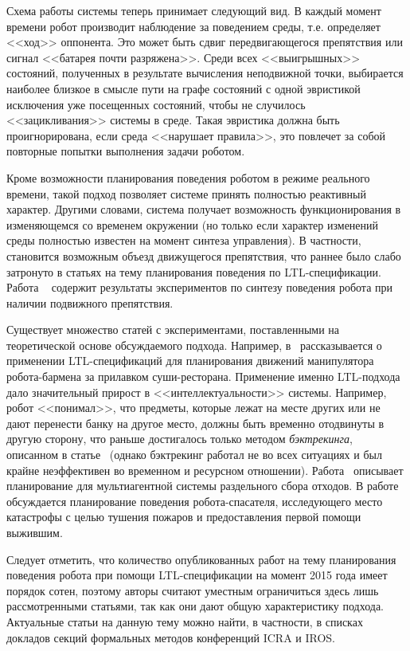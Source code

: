 \documentclass[a4, 14pt]{article}
\begin{document}
Схема работы системы теперь принимает следующий вид. В каждый момент времени 
робот производит наблюдение за поведением среды, т.е. определяет <<ход>> 
оппонента. Это может быть сдвиг передвигающегося препятствия или сигнал <<батарея 
почти разряжена>>. Среди всех <<выигрышных>> состояний, полученных в результате 
вычисления неподвижной точки, выбирается наиболее близкое в смысле пути на графе 
состояний с одной эвристикой исключения уже посещенных состояний, чтобы не 
случилось <<зацикливания>> системы в среде. Такая эвристика должна быть 
проигнорирована, если среда <<нарушает правила>>, это повлечет за собой повторные 
попытки выполнения задачи роботом.

Кроме возможности планирования поведения роботом в режиме реального времени, 
такой подход позволяет системе принять полностью реактивный характер. 
Другими словами, система получает возможность функционирования в изменяющемся со временем окружении 
(но только если характер изменений среды полностью известен на момент синтеза управления).
В частности, становится возможным объезд движущегося препятствия, что раннее было 
слабо затронуто в статьях на тему планирования поведения по LTL-спецификации. 
Работа ~\cite{piterman2006synthesis} содержит результаты экспериментов по 
синтезу поведения робота при наличии подвижного препятствия.

Существует множество статей с экспериментами, поставленными на теоретической 
основе обсуждаемого подхода. Например, в~\cite{he2015towards} рассказывается 
о применении LTL-спецификаций для планирования движений манипулятора 
робота-бармена за прилавком суши-ресторана. Применение именно LTL-подхода 
дало значительный прирост в <<интеллектуальности>> системы. Например, робот 
<<понимал>>, что предметы, которые лежат на месте других или не дают перенести 
банку на другое место, должны быть временно отодвинуты в другую сторону, что 
раньше достигалось только методом \textit{бэктрекинга}, описанном в статье~\cite{srivastava2014combined}
(однако бэктрекинг работал не во всех ситуациях и был крайне неэффективен во 
временном и ресурсном отношении). Работа~\cite{raman2014synthesis} описывает 
планирование для мультиагентной системы раздельного сбора отходов. В 
работе~\cite{vasile2014reactive} обсуждается планирование поведения робота-спасателя, 
исследующего место катастрофы с целью тушения пожаров и предоставления первой 
помощи выжившим.

Следует отметить, что количество опубликованных работ на тему планирования 
поведения робота при помощи LTL-спецификации на момент 2015 года имеет порядок 
сотен, поэтому авторы считают уместным ограничиться здесь лишь рассмотренными 
статьями, так как они дают общую характеристику подхода. Актуальные статьи на 
данную тему можно найти, в частности, в списках докладов секций формальных 
методов конференций ICRA и IROS.
\end{document}

